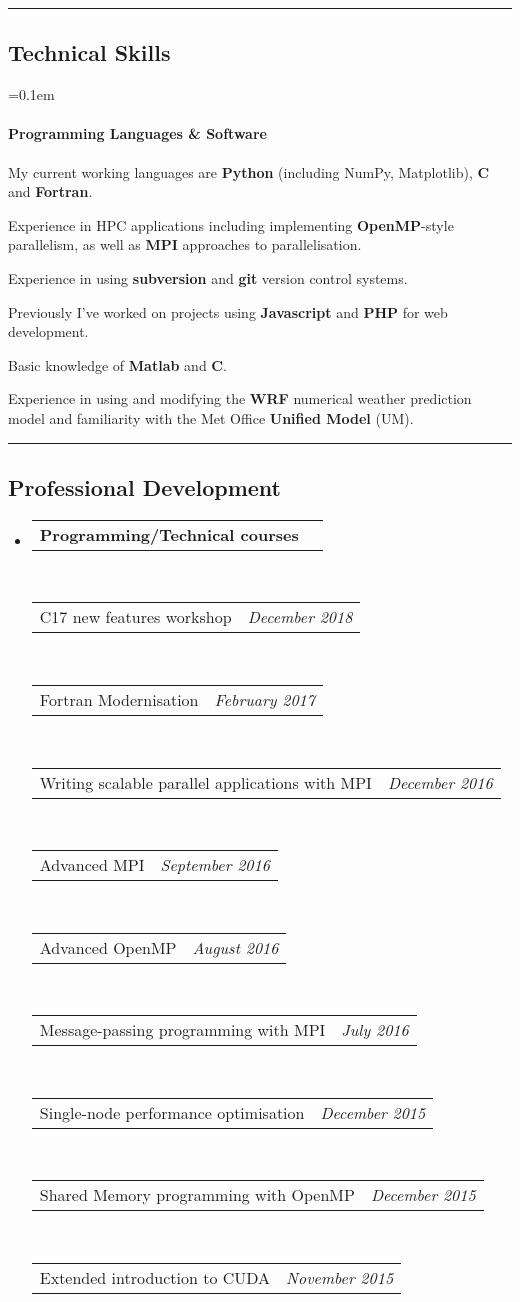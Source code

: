 \documentclass[10.5pt,a4]{article}
\makeatletter
\newcommand{\headerrow}[2]
{\begin{tabular*}{\linewidth}{l@{\extracolsep{\fill}}r}
	#1 &
	#2 \\
\end{tabular*}}
\newcommand{\CPP}
{C\nolinebreak[4]\hspace{-.05em}\raisebox{.22ex}{\footnotesize\bf ++}}
\makeatother
\begin{document}
\hrule
\vspace{-0.4em}
\subsection*{Technical Skills}
	\parskip=0.1em
	\paragraph*{Programming Languages \& Software}
		\begin{itemize*}
		\item My current working languages are \textbf{Python} (including NumPy, Matplotlib), {\textbf{\CPP}} and {\textbf{Fortran}}. 
		\item Experience in HPC applications including implementing \textbf{OpenMP}-style parallelism, as well as \textbf{MPI} approaches to parallelisation. 
		\item Experience in using \textbf{subversion} and \textbf{git} version control systems. 
		\item Previously I've worked on projects using \textbf{Javascript} and \textbf{PHP} for web development. 
		\item Basic knowledge of \textbf{Matlab} and \textbf{C}.
	\item Experience in using and modifying the \textbf{WRF} numerical weather prediction model and familiarity with the Met Office \textbf{Unified Model} (UM).
	\end{itemize*}


\hrule
\vspace{-0.4em}
\subsection*{Professional Development}
\begin{itemize}
	\item 
	\headerrow
		{\textbf{Programming/Technical courses}}
		{}
	\\
		\headerrow
		{{\CPP}17 new features workshop}
		{\emph{December 2018}}
	\\
		\headerrow
		{Fortran Modernisation}
		{\emph{February 2017}}
	\\
	\headerrow
		{Writing scalable parallel applications with MPI}
		{\emph{December 2016}}
	\\
	\headerrow
		{Advanced MPI}
		{\emph{September 2016}}
		\\
	\headerrow
		{Advanced OpenMP}
		{\emph{August 2016}}
	\\
	\headerrow
		{Message-passing programming with MPI}
		{\emph{July 2016}}
	\\
	\headerrow
		{Single-node performance optimisation}
		{\emph{December 2015}}
	\\
	\headerrow
		{Shared Memory programming with OpenMP}
		{\emph{December 2015}}
	\\
	\headerrow
		{Extended introduction to CUDA}
		{\emph{November 2015}}
\end{itemize}
\end{document}
